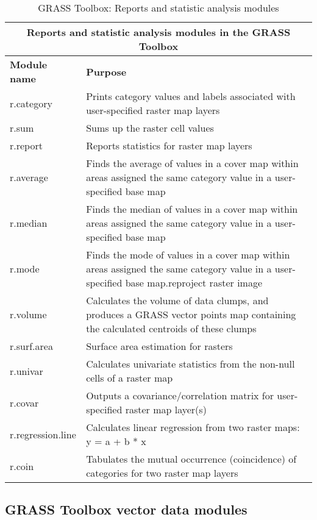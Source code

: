 \begin{table}[ht]
\centering
\caption{GRASS Toolbox: Reports and statistic analysis modules}\medskip
 \begin{tabular}{|p{4cm}|p{12cm}|}
  \hline \multicolumn{2}{|c|}{\textbf{Reports and statistic analysis modules in the GRASS Toolbox}} \\
  \hline \textbf{Module name} & \textbf{Purpose} \\
  \hline r.category & Prints category values and labels associated with
  user-specified raster map layers \\
  \hline r.sum & Sums up the raster cell values \\
  \hline r.report & Reports statistics for raster map layers \\
  \hline r.average & Finds the average of values in a cover map within areas
  assigned the same category value in a user-specified base map \\
  \hline r.median & Finds the median of values in a cover map within areas
  assigned the same category value in a user-specified base map \\
  \hline r.mode & Finds the mode of values in a cover map within areas
  assigned the same category value in a user-specified base map.reproject
  raster image \\
  \hline r.volume & Calculates the volume of data clumps, and produces a
  GRASS vector points map containing the calculated centroids of these clumps \\
  \hline r.surf.area & Surface area estimation for rasters \\
  \hline r.univar & Calculates univariate statistics from the non-null cells
  of a raster map \\
  \hline r.covar & Outputs a covariance/correlation matrix for user-specified
  raster map layer(s)\\
  \hline r.regression.line & Calculates linear regression from two raster
  maps: y = a + b * x \\
  \hline r.coin & Tabulates the mutual occurrence (coincidence) of categories
  for two raster map layers\\
\hline
\end{tabular}
\end{table}

\clearpage

\subsection{GRASS Toolbox vector data modules}

